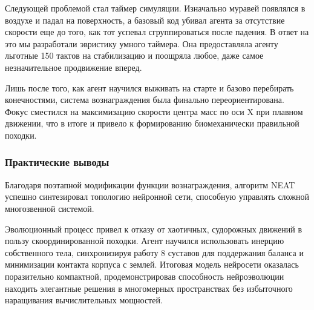 Следующей проблемой стал таймер симуляции. Изначально муравей появлялся в воздухе и падал на поверхность, а базовый код убивал агента за отсутствие скорости еще до того, как тот успевал сгруппироваться после падения. В ответ на это мы разработали эвристику умного таймера. Она предоставляла агенту льготные 150 тактов на стабилизацию и поощряла любое, даже самое незначительное продвижение вперед.

Лишь после того, как агент научился выживать на старте и базово перебирать конечностями, система вознаграждения была финально переориентирована. Фокус сместился на максимизацию скорости центра масс по оси X при плавном движении, что в итоге и привело к формированию биомеханически правильной походки.


\subsubsection{Практические выводы}

Благодаря поэтапной модификации функции вознаграждения, алгоритм NEAT успешно синтезировал топологию нейронной сети, способную управлять сложной многозвенной системой.

Эволюционный процесс привел к отказу от хаотичных, судорожных движений в пользу скоординированной походки. Агент научился использовать инерцию собственного тела, синхронизируя работу 8 суставов для поддержания баланса и минимизации контакта корпуса с землей. Итоговая модель нейросети оказалась поразительно компактной, продемонстрировав способность нейроэволюции находить элегантные решения в многомерных пространствах без избыточного наращивания вычислительных мощностей.